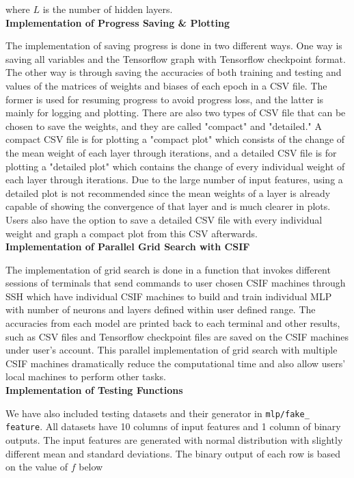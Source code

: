 \documentclass[12pt]{article}
\begin{document}
where $L$ is the number of hidden layers. \\ 


\textbf{Implementation of Progress Saving \& Plotting}

\quad The implementation of saving progress is done in two different ways. One way is saving all variables and the Tensorflow graph with Tensorflow checkpoint format. The other way is through saving the accuracies of both training and testing and values of the matrices of weights and biases of each epoch in a CSV file. The former is used for resuming progress to avoid progress loss, and the latter is mainly for logging and plotting. There are also two types of CSV file that can be chosen to save the weights, and they are called "compact" and "detailed." A compact CSV file is for plotting a "compact plot" which consists of the change of the mean weight of each layer through iterations, and a detailed CSV file is for plotting a "detailed plot" which contains the change of every individual weight of each layer through iterations. Due to the large number of input features, using a detailed plot is not recommended since the mean weights of a layer is already capable of showing the convergence of that layer and is much clearer in plots. Users also have the option to save a detailed CSV file with every individual weight and graph a compact plot from this CSV afterwards. \\ 


\textbf{Implementation of Parallel Grid Search with CSIF}

\quad The implementation of grid search is done in a function that invokes different sessions of terminals that send commands to user chosen CSIF machines through SSH which have individual CSIF machines to build and train individual MLP with number of neurons and layers defined within user defined range. The accuracies from each model are printed back to each terminal and other results, such as CSV files and Tensorflow checkpoint files are saved on the CSIF machines under user's account. This parallel implementation of grid search with multiple CSIF machines dramatically reduce the computational time and also allow users' local machines to perform other tasks. \\

\textbf{Implementation of Testing Functions} 

\quad We have also included testing datasets and their generator in \texttt{mlp/fake\_\\feature}. All datasets have 10 columns of input features and 1 column of binary outputs. The input features are generated with normal distribution with slightly different mean and standard deviations. The binary output of each row is based on the value of $f$ below
\end{document}

